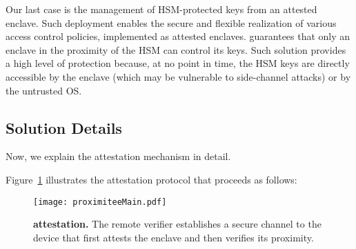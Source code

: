  Our last case is the management of HSM-protected keys from an attested enclave. Such deployment enables the secure and flexible realization of various access control policies, implemented as attested enclaves. \name guarantees that only an enclave in the proximity of the HSM can control its keys. Such solution provides a high level of protection because, at no point in time, the HSM keys are directly accessible by the enclave (which may be vulnerable to side-channel attacks) or by the untrusted OS.


\subsection{Solution Details}
\label{sec:systemDesign}


Now, we explain the \name attestation mechanism in detail.


 Figure~\ref{fig:systemSetUp} illustrates the attestation protocol that proceeds as follows:


\begin{figure}[t]
 \centering
  \texttt{[image: proximiteeMain.pdf]}
 \caption{\textbf{\name attestation.} The remote verifier establishes a secure channel to the \device device that first attests the enclave and then verifies its proximity.}
 	\label{fig:systemSetUp}
 	\figsaverL
\end{figure}

